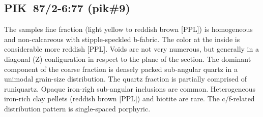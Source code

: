 \documentclass[a4paper]{article}
\begin{document}
\newpage\subsection{PIK~87/2-6:77 (pik\#9)}

\begin{multicols}{2}
\noindent The samples fine fraction (light yellow to reddish brown [PPL]) is homogeneous and non-calcareous with stipple-speckled b-fabric. The color at the inside is considerable more reddish [PPL]. Voids are not very numerous, but generally in a diagonal (Z) configuration in respect to the plane of the section. The dominant component of the coarse fraction is densely packed sub-angular quartz in a unimodal grain-size distribution. The quartz fraction is partially comprised of runiquartz. Opaque iron-righ sub-angular inclusions are common. Heterogeneous iron-rich clay pellets (reddish brown [PPL]) and biotite are rare. The c/f-related distribution pattern is single-spaced porphyric.
\end{multicols}
\end{document}
